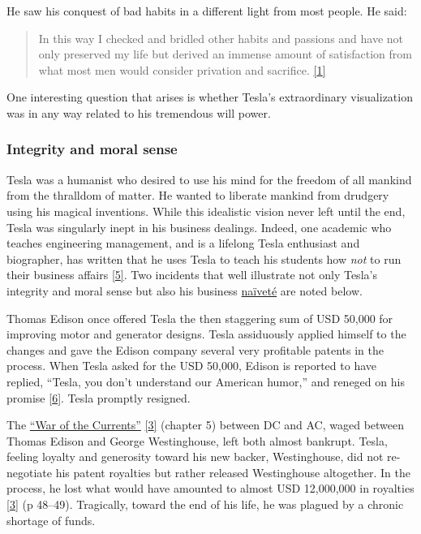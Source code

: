 \documentclass[
  a4paper,
]{article}
\begin{document}
He saw his conquest of bad habits in a different light from most people.
He said:

\begin{quote}
In this way I checked and bridled other habits and passions and have not
only preserved my life but derived an immense amount of satisfaction
from what most men would consider privation and sacrifice.
\protect\hyperlink{ref-john83}{{[}1{]}}
\end{quote}

One interesting question that arises is whether Tesla's extraordinary
visualization was in any way related to his tremendous will power.

\hypertarget{integrity-and-moral-sense}{%
\subsubsection{Integrity and moral
sense}\label{integrity-and-moral-sense}}

Tesla was a humanist who desired to use his mind for the freedom of all
mankind from the thralldom of matter. He wanted to liberate mankind from
drudgery using his magical inventions. While this idealistic vision
never left until the end, Tesla was singularly inept in his business
dealings. Indeed, one academic who teaches engineering management, and
is a lifelong Tesla enthusiast and biographer, has written that he uses
Tesla to teach his students how \emph{not} to run their business affairs
\protect\hyperlink{ref-lomas99}{{[}5{]}}. Two incidents that well
illustrate not only Tesla's integrity and moral sense but also his
business \href{https://www.thefreedictionary.com/naivete}{naïveté} are
noted below.

Thomas Edison once offered Tesla the then staggering sum of USD 50,000
for improving motor and generator designs. Tesla assiduously applied
himself to the changes and gave the Edison company several very
profitable patents in the process. When Tesla asked for the USD 50,000,
Edison is reported to have replied, ``Tesla, you don't understand our
American humor,'' and reneged on his promise
\protect\hyperlink{ref-tesla-wiki}{{[}6{]}}. Tesla promptly resigned.

The \href{https://en.wikipedia.org/wiki/War_of_the_currents}{``War of
the Currents''} \protect\hyperlink{ref-cheney81}{{[}3{]}} (chapter 5)
between DC and AC, waged between Thomas Edison and George Westinghouse,
left both almost bankrupt. Tesla, feeling loyalty and generosity toward
his new backer, Westinghouse, did not re-negotiate his patent royalties
but rather released Westinghouse altogether. In the process, he lost
what would have amounted to almost USD 12,000,000 in royalties
\protect\hyperlink{ref-cheney81}{{[}3{]}} (p 48--49). Tragically, toward
the end of his life, he was plagued by a chronic shortage of funds.
\end{document}
